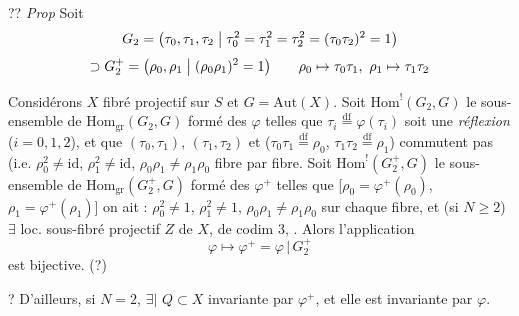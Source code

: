 \documentclass[11pt,a4paper]{article}
\begin{document}
?? \emph{Prop} Soit
\[
G_2 = \bigl(\tau_0, \tau_1, \tau_2 \bigm| \tau_0^2 = \tau_1^2 = \tau_2^2 = (\tau_0\tau_2)^2 = 1\bigr)
\]
\[
\supset G_2^{+} = \bigl(\rho_0, \rho_1 \bigm| (\rho_0\rho_1)^2 = 1\bigr)
\qquad \rho_0 \mapsto \tau_0\tau_1,\ \rho_1 \mapsto \tau_1\tau_2
\]

Considérons $X$ fibré projectif sur $S$  et  $G = \mathrm{Aut}(X)$.  Soit $\mathrm{Hom}^{!}(G_2, G)$ le sous-ensemble de $\mathrm{Hom}_{\mathrm{gr}}(G_2, G)$ formé des $\varphi$ telles que $\tau_i \overset{\mathrm{df}}{=} \varphi(\tau_i)$ soit une \emph{réflexion} ($i = 0, 1, 2$), et que $(\tau_0, \tau_1)$, $(\tau_1, \tau_2)$ et \ill{} ($\tau_0\tau_1 \overset{\mathrm{df}}{=} \rho_0$, $\tau_1\tau_2 \overset{\mathrm{df}}{=} \rho_1$)  \ill{} commutent pas (i.e. $\rho_0^2 \neq \mathrm{id}$, $\rho_1^2 \neq \mathrm{id}$, $\rho_0\rho_1 \neq \rho_1\rho_0$ fibre par fibre. Soit $\mathrm{Hom}^{!}(G_2^{+}, G)$ le sous-ensemble de $\mathrm{Hom}_{\mathrm{gr}}(G_2^{+}, G)$ formé des $\varphi^{+}$ telles que [$\rho_0 = \varphi^{+}(\rho_0)$, $\rho_1 = \varphi^{+}(\rho_1)$] on ait : $\rho_0^2 \neq 1$, $\rho_1^2 \neq 1$, $\rho_0\rho_1 \neq \rho_1\rho_0$ sur chaque fibre, et (si $N \geq 2$) $\exists$ loc. sous-fibré projectif $Z$ de $X$, de codim 3,  . Alors l'application
\[
\varphi \longmapsto \varphi^{+} = \varphi \,|\, G_2^{+}
\]
est bijective. (?)

? D'ailleurs, si $N = 2$, $\exists|$   $Q \subset X$ invariante par $\varphi^{+}$, et elle est invariante par $\varphi$.
\end{document}
